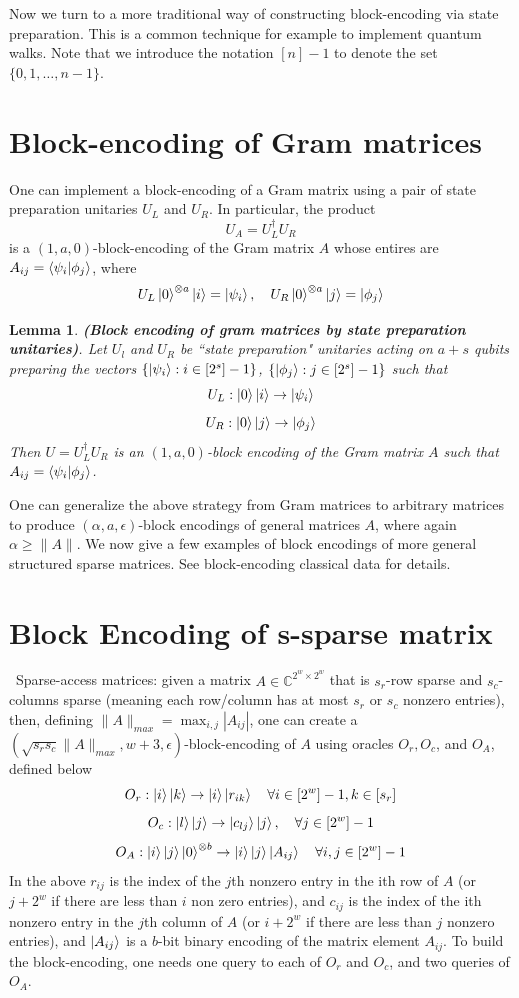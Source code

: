 \documentclass[12pt, oneside]{book}
\newtheorem{lemma}[theorem]{Lemma}
\theoremstyle{definition}
\theoremstyle{definition}
\theoremstyle{remark}
\begin{document}
Now we turn to a more traditional way of constructing block-encoding via state preparation. This is a common technique for example to implement quantum walks. Note that we introduce the notation $[n]-1$ to denote the set $\{0,1,\ldots,n-1\}$.

\section{Block-encoding of Gram matrices}
One can implement a block-encoding of a Gram matrix using a pair of state preparation unitaries $U_L$ and $U_R$. In particular, the product
\[
U_A=U_L^{\dagger}U_R
\]
is a $(1,a,0)$-block-encoding of the Gram matrix $A$ whose entires are $A_{ij}=\braket{\psi_i|\phi_j}$, where 
\[
U_L\ket{0}^{\otimes a}\ket{i}=\ket{\psi_i}, \quad U_R\ket{0}^{\otimes a}\ket{j}=\ket{\phi_j}
\]
\begin{lemma}
    \textbf{(Block encoding of gram matrices by state preparation unitaries)}. Let $U_l$ and $U_R$ be ``state preparation" unitaries acting on $a+s$ qubits preparing the vectors $\{\ket{\psi_i}:i\in [2^s]-1\}$, $\{\ket{\phi_j}:j\in[2^s]-1\}$ such that
    \[
    U_L:\ket{0}\ket{i}\rightarrow \ket{\psi_i}
    \]
    \[
    U_R:\ket{0}\ket{j}\rightarrow \ket{\phi_j}
    \]
    Then $U=U_L^{\dagger}U_R$ is an $(1,a,0)$-block encoding of the Gram matrix $A$ such that $A_{ij}=\braket{\psi_i|\phi_j}$.
\end{lemma}
One can generalize the above strategy from Gram matrices to arbitrary matrices to produce $(\alpha,a,\epsilon)$-block encodings of general matrices $A$, where again $\alpha\geq \|A\|$.
We now give a few examples of block encodings of more general structured sparse matrices. See block-encoding classical data for details.


\section{Block Encoding of s-sparse matrix}\
Sparse-access matrices: given a matrix $A\in\mathbb{C}^{2^w\times2^w}$ that is $s_r$-row sparse and $s_c$-columns sparse (meaning each row/column has at most $s_r$ or $s_c$ nonzero entries), then, defining $\|A\|_{max}=\max_{i,j} |A_{ij}|$, one can create a $(\sqrt{s_rs_c}\|A\|_{max},w+3,\epsilon)$-block-encoding of $A$ using oracles $O_r,O_c$, and $O_A$, defined below
\[
O_r:\ket{i}\ket{k}\rightarrow \ket{i}\ket{r_{ik}}\quad \forall i \in [2^w]-1,k\in[s_r]
\]
\[
O_c:\ket{l}\ket{j}\rightarrow \ket{c_{lj}}\ket{j}, \quad \forall j \in [2^w]-1
\]
\[
O_A:\ket{i}\ket{j}\ket{0}^{\otimes b}\rightarrow \ket{i}\ket{j}\ket{A_{ij}}\quad \forall i,j \in [2^w]-1
\]
In the above $r_{ij}$ is the index of the $j$th nonzero entry in the ith row of $A$ (or $j+2^w$ if there are less than $i$ non zero entries), and $c_{ij}$ is the index of the ith nonzero entry in the $j$th column of $A$ (or $i+2^w$ if there are less than $j$ nonzero entries), and $\ket{A_{ij}}$ is a $b$-bit binary encoding of the matrix element $A_{ij}$. To build the block-encoding, one needs one query to each of $O_r$ and $O_c$, and two queries of $O_A$. 
\end{document}
